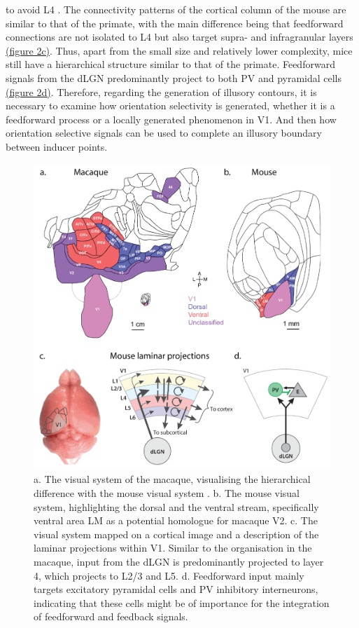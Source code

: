 \documentclass[12pt]{article}
\begin{document}
to avoid L4 \autocite{rocklandWhatWeKnow2019}. The connectivity patterns of the cortical column of the mouse are similar to that of the primate, with the main difference being that feedforward connections are not isolated to L4 but also target supra- and infragranular layers \hyperref[fig:Laminar_Figure]{(figure 2c)}. Thus, apart from the small size and relatively lower complexity, mice still have a hierarchical structure similar to that of the primate. Feedforward signals from the dLGN predominantly project to both PV and pyramidal cells \hyperref[fig:Laminar_Figure]{(figure 2d)}. Therefore, regarding the generation of illusory contours, it is necessary to examine how orientation selectivity is generated, whether it is a feedforward process or a locally generated phenomenon in V1. And then how orientation selective signals can be used to complete an illusory boundary between inducer points. 

\begin{figure}[H]
  \centering
  \includegraphics[width=0.9 \textwidth]{adjusted_figures/Laminar_Figure.png}
  \caption{a. The visual system of the macaque, visualising the hierarchical difference with the mouse visual system \autocite{gamanutAnatomicalFunctionalConnectomes2022}. b. The mouse visual system, highlighting the dorsal and the ventral stream, specifically ventral area LM as a potential homologue for macaque V2. c. The visual system mapped on a cortical image and a description of the laminar projections within V1. Similar to the organisation in the macaque, input from the dLGN is predominantly projected to layer 4, which projects to L2/3 and L5. d. Feedforward input mainly targets excitatory pyramidal cells and PV inhibitory interneurons, indicating that these cells might be of importance for the integration of feedforward and feedback signals.
  \autocite{niellHowCorticalCircuits2021}}
  \label{fig:Laminar_Figure}
\end{figure}
\end{document}

